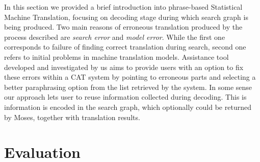 In this section we provided a brief introduction into phrase-based Statistical Machine Translation, focusing on decoding stage during which search graph is being produced. Two main reasons of erroneous translation produced by the process described are \textit{search error} and \textit{model error}. While the first one corresponds to failure of finding correct translation during search, second one refers to initial problems in machine translation models. Assistance tool developed and investigated by us aims to provide users with an option to fix these errors within a CAT system by pointing to erroneous parts and selecting a better paraphrasing option from the list retrieved by the system. In some sense our approach lets user to reuse information collected during decoding. This is information is encoded in the search graph, which optionally could be returned by Moses, together with translation results. 

\section{Evaluation}


